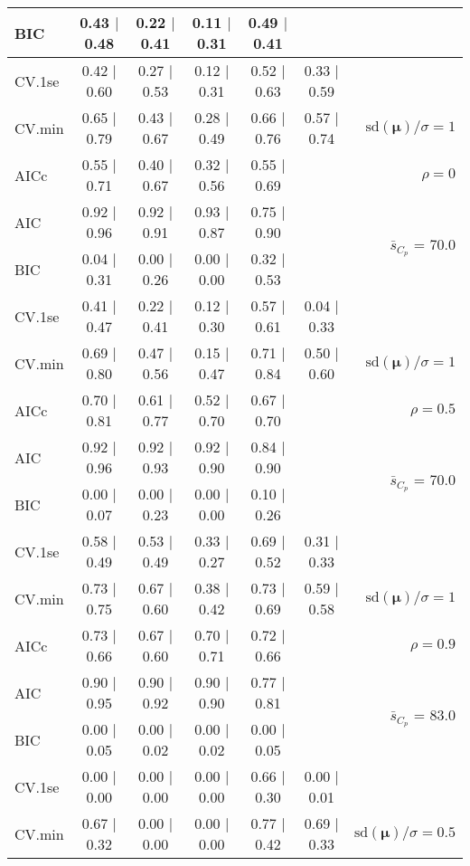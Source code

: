 \documentclass[12pt]{article}
\newcommand{\mr}[1]{\mathrm{#1}}
\newcommand{\bm}[1]{\mathbf{#1}}
\begin{document}
\begin{table}[p]
\begin{center}
\begin{tabular}{l*{5}{c}|r}
BIC & 0.43 $\mid$ 0.48 & 0.22 $\mid$ 0.41 & 0.11 $\mid$ 0.31 & 0.49 $\mid$ 0.41 & & \\
 \hline 
CV.1se & 0.42 $\mid$ 0.60 & 0.27 $\mid$ 0.53 & 0.12 $\mid$ 0.31 & 0.52 $\mid$ 0.63 & 0.33 $\mid$ 0.59 &\\
CV.min & 0.65 $\mid$ 0.79 & 0.43 $\mid$ 0.67 & 0.28 $\mid$ 0.49 & 0.66 $\mid$ 0.76 & 0.57 $\mid$ 0.74 &  $\mr{sd}(\bm{\mu})/\sigma=1$ \\
AICc & 0.55 $\mid$ 0.71 & 0.40 $\mid$ 0.67 & 0.32 $\mid$ 0.56 & 0.55 $\mid$ 0.69 & & $\rho=0$ \\
AIC & 0.92 $\mid$ 0.96 & 0.92 $\mid$ 0.91 & 0.93 $\mid$ 0.87 & 0.75 $\mid$ 0.90 & & \multirow{2}{*}{$\bar{s}_{C_p}$ = 70.0} \\
BIC & 0.04 $\mid$ 0.31 & 0.00 $\mid$ 0.26 & 0.00 $\mid$ 0.00 & 0.32 $\mid$ 0.53 & & \\
 \hline 
CV.1se & 0.41 $\mid$ 0.47 & 0.22 $\mid$ 0.41 & 0.12 $\mid$ 0.30 & 0.57 $\mid$ 0.61 & 0.04 $\mid$ 0.33 &\\
CV.min & 0.69 $\mid$ 0.80 & 0.47 $\mid$ 0.56 & 0.15 $\mid$ 0.47 & 0.71 $\mid$ 0.84 & 0.50 $\mid$ 0.60 &  $\mr{sd}(\bm{\mu})/\sigma=1$ \\
AICc & 0.70 $\mid$ 0.81 & 0.61 $\mid$ 0.77 & 0.52 $\mid$ 0.70 & 0.67 $\mid$ 0.70 & & $\rho=0.5$ \\
AIC & 0.92 $\mid$ 0.96 & 0.92 $\mid$ 0.93 & 0.92 $\mid$ 0.90 & 0.84 $\mid$ 0.90 & & \multirow{2}{*}{$\bar{s}_{C_p}$ = 70.0} \\
BIC & 0.00 $\mid$ 0.07 & 0.00 $\mid$ 0.23 & 0.00 $\mid$ 0.00 & 0.10 $\mid$ 0.26 & & \\
 \hline 
CV.1se & 0.58 $\mid$ 0.49 & 0.53 $\mid$ 0.49 & 0.33 $\mid$ 0.27 & 0.69 $\mid$ 0.52 & 0.31 $\mid$ 0.33 &\\
CV.min & 0.73 $\mid$ 0.75 & 0.67 $\mid$ 0.60 & 0.38 $\mid$ 0.42 & 0.73 $\mid$ 0.69 & 0.59 $\mid$ 0.58 &  $\mr{sd}(\bm{\mu})/\sigma=1$ \\
AICc & 0.73 $\mid$ 0.66 & 0.67 $\mid$ 0.60 & 0.70 $\mid$ 0.71 & 0.72 $\mid$ 0.66 & & $\rho=0.9$ \\
AIC & 0.90 $\mid$ 0.95 & 0.90 $\mid$ 0.92 & 0.90 $\mid$ 0.90 & 0.77 $\mid$ 0.81 & & \multirow{2}{*}{$\bar{s}_{C_p}$ = 83.0} \\
BIC & 0.00 $\mid$ 0.05 & 0.00 $\mid$ 0.02 & 0.00 $\mid$ 0.02 & 0.00 $\mid$ 0.05 & & \\
 \hline 
CV.1se & 0.00 $\mid$ 0.00 & 0.00 $\mid$ 0.00 & 0.00 $\mid$ 0.00 & 0.66 $\mid$ 0.30 & 0.00 $\mid$ 0.01 &\\
CV.min & 0.67 $\mid$ 0.32 & 0.00 $\mid$ 0.00 & 0.00 $\mid$ 0.00 & 0.77 $\mid$ 0.42 & 0.69 $\mid$ 0.33 &  $\mr{sd}(\bm{\mu})/\sigma=0.5$ \\

\end{tabular}
\end{center}
\end{table}
\end{document}
